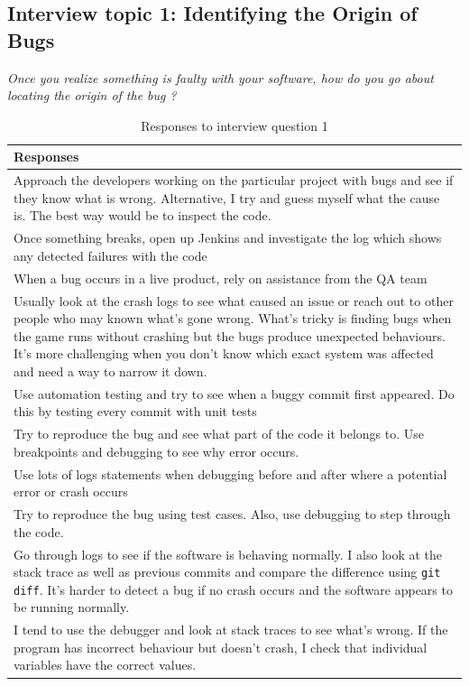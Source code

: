 \documentclass[../main.tex]{subfiles}
\begin{document}
\subsection{Interview topic 1: Identifying the Origin of Bugs}

\textit{Once you realize something is faulty with your software, how do you go about locating the origin of the bug ?}

\begin{table}[H]
\centering
\caption{Responses to interview question 1}
    \begin{tabular}{|p{15cm}|}
        \hline
        \textbf{Responses}\\ 
        \hline\hline
        Approach the developers working on the particular project with bugs and see if they know what is wrong. Alternative, I try and guess myself what the cause is. The best way would be to inspect the code.\\
        \hline
        Once something breaks, open up Jenkins and investigate the log which shows any detected failures with the code\\
        \hline
        When a bug occurs in a live product, rely on assistance from the QA team\\
        \hline
        Usually look at the crash logs to see what caused an issue or reach out to other people who may known what's gone wrong. What's tricky is finding bugs when the game runs without crashing but the bugs produce unexpected behaviours. It's more challenging when you don't know which exact system was affected and need a way to narrow it down.\\
        \hline
        Use automation testing and try to see when a buggy commit first appeared. Do this by testing every commit with unit tests\\
        \hline
        Try to reproduce the bug and see what part of the code it belongs to. Use breakpoints and debugging to see why error occurs.\\
        \hline
        Use lots of logs statements when debugging before and after where a potential error or crash occurs\\
        \hline
        Try to reproduce the bug using test cases. Also, use debugging to step through the code.\\
        \hline
        Go through logs to see if the software is behaving normally. I also look at the stack trace as well as previous commits and compare the difference using \texttt{git diff}. It's harder to detect a bug if no crash occurs and the software appears to be running normally. \\
        \hline
        I tend to use the debugger and look at stack traces to see what's wrong. If the program has incorrect behaviour but doesn't crash, I check that individual variables have the correct values. \\
        \hline
    \end{tabular}
\label{table:rq4Table1}
\end{table}
\end{document}
